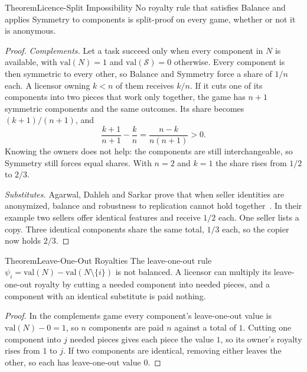 \begin{pdclaim}{Theorem}{Licence-Split Impossibility}
\setlength{\parskip}{4pt plus 1pt}
\label{thm:he-licence-split}
No royalty rule that satisfies Balance and applies Symmetry to components is
split-proof on every game, whether or not it is anonymous.
\end{pdclaim}
\begin{proof}
\setlength{\parskip}{4pt plus 1pt}
\emph{Complements.} Let a task succeed only when every component in $N$ is
available, with $\mathrm{val}(N)=1$ and $\mathrm{val}(\mathcal S)=0$ otherwise. Every component is then
symmetric to every other, so Balance and Symmetry force a share of $1/n$
each. A licensor owning $k<n$ of them receives $k/n$. If it cuts one of its
components into two pieces that work only together, the game has $n+1$
symmetric components and the same outcomes. Its share becomes
$(k+1)/(n+1)$, and
\[
\frac{k+1}{n+1}-\frac{k}{n}=\frac{n-k}{n(n+1)}>0 .
\]
Knowing the owners does not help: the components are still interchangeable,
so Symmetry still forces equal shares. With $n=2$ and $k=1$ the share rises
from $1/2$ to $2/3$.

\emph{Substitutes.} Agarwal, Dahleh and Sarkar prove that when seller
identities are anonymized, balance and robustness to replication cannot hold
together~. In their example two sellers offer
identical features and receive $1/2$ each. One seller lists a copy. Three
identical components share the same total, $1/3$ each, so the copier now
holds $2/3$.
\end{proof}

\begin{pdclaim}{Theorem}{Leave-One-Out Royalties}
\setlength{\parskip}{4pt plus 1pt}
\label{thm:he-loo-royalty}
The leave-one-out rule $\psi_i=\mathrm{val}(N)-\mathrm{val}(N\setminus\{i\})$ is not balanced. A
licensor can multiply its leave-one-out royalty by cutting a needed
component into needed pieces, and a component with an identical substitute
is paid nothing.
\end{pdclaim}
\begin{proof}
\setlength{\parskip}{4pt plus 1pt}
In the complements game every component's leave-one-out value is $\mathrm{val}(N)-0=1$,
so $n$ components are paid $n$ against a total of $1$. Cutting one component
into $j$ needed pieces gives each piece the value $1$, so its owner's royalty
rises from $1$ to $j$. If two components are identical, removing either
leaves the other, so each has leave-one-out value $0$.
\end{proof}

